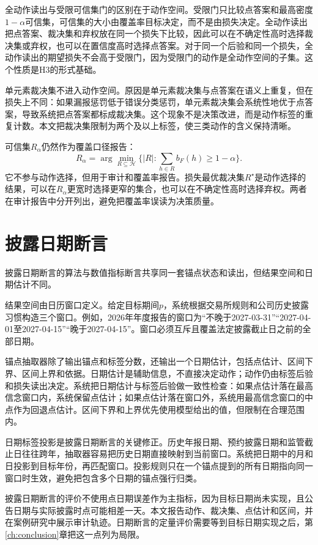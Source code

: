 全动作读出与受限可信集门的区别在于动作空间。受限门只比较点答案和最高密度$1-\alpha$可信集，可信集的大小由覆盖率目标决定，而不是由损失决定。全动作读出把点答案、裁决集和弃权放在同一个损失下比较，因此可以在不确定性高时选择裁决集或弃权，也可以在置信度高时选择点答案。对于同一个后验和同一个损失，全动作读出的期望损失不会高于受限门，因为受限门的动作是全动作空间的子集。这个性质是H3的形式基础。

单元素裁决集不进入动作空间。原因是单元素裁决集与点答案在语义上重复，但在损失上不同：如果漏报惩罚低于错误分类惩罚，单元素裁决集会系统性地优于点答案，导致系统把点答案都标成裁决集。这个现象不是决策改进，而是动作标签的重复计数。本文把裁决集限制为两个及以上标签，使三类动作的含义保持清晰。

可信集$R_\alpha$仍然作为覆盖口径报告：
\begin{equation}
R_\alpha=\arg\min_{R\subseteq\mathcal H}\{|R|:\sum_{h\in R}b_F(h)\ge1-\alpha\}.
\label{eq:credible}
\end{equation}
它不参与动作选择，但用于审计和覆盖率报告。损失最优裁决集$R^\star$是动作选择的结果，可以在$R_\alpha$更宽时选择更窄的集合，也可以在不确定性高时选择弃权。两者在审计报告中分开列出，避免把覆盖率误读为决策质量。

\section{披露日期断言}

披露日期断言的算法与数值指标断言共享同一套锚点状态和读出，但结果空间和日期估计不同。

结果空间由日历窗口定义。给定目标期间$p$，系统根据交易所规则和公司历史披露习惯构造三个窗口。例如，2026年年度报告的窗口为“不晚于2027-03-31”“2027-04-01至2027-04-15”“晚于2027-04-15”。窗口必须互斥且覆盖法定披露截止日之前的全部日期。

锚点抽取器除了输出锚点和标签分数，还输出一个日期估计，包括点估计、区间下界、区间上界和依据。日期估计是辅助信息，不直接决定动作；动作仍由标签后验和损失读出决定。系统把日期估计与标签后验做一致性检查：如果点估计落在最高信念窗口内，系统保留点估计；如果点估计落在窗口外，系统用最高信念窗口的中点作为回退点估计。区间下界和上界优先使用模型给出的值，但限制在合理范围内。

日期标签投影是披露日期断言的关键修正。历史年报日期、预约披露日期和监管截止日往往跨年，抽取器容易把历史日期直接映射到当前窗口。系统把日期中的月和日投影到目标年份，再匹配窗口。投影规则只在一个锚点提到的所有日期指向同一窗口时生效，避免把包含多个日期的锚点强行归类。

披露日期断言的评价不使用点日期误差作为主指标，因为目标日期尚未实现，且公告日期与实际披露时点可能相差一天。本文报告动作、裁决集、点估计和区间，并在案例研究中展示审计轨迹。日期断言的定量评价需要等到目标日期实现之后，第\ref{ch:conclusion}章把这一点列为局限。

